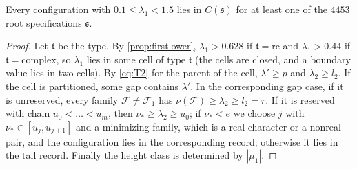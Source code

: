 \begin{theorem}\label{thm:sourcecover}
Every configuration with $0.1\le\lambda_1<1.5$ lies in $C(\mathfrak s)$ for at least one of the $4453$
root specifications $\mathfrak s$.
\end{theorem}

\begin{proof}
Let $\mathfrak t$ be the type. By \cref{prop:firstlower}, $\lambda_1>0.628$ if $\mathfrak t=\mathrm{rc}$ and
$\lambda_1>0.44$ if $\mathfrak t=\mathrm{complex}$, so $\lambda_1$ lies in some cell of type $\mathfrak t$ (the
cells are closed, and a boundary value lies in two cells). By \eqref{eq:T2} for the parent of the
cell, $\lambda'\ge p$ and $\lambda_2\ge l_2$. If the cell is partitioned, some gap contains $\lambda'$.
In the corresponding gap case, if it is unreserved, every family $\mathcal F\ne\mathcal F_1$ has $\nu(\mathcal F)\ge\lambda_2\ge
l_2=r$. If it is reserved with chain $u_0<\dots<u_m$, then $\nu_*\ge\lambda_2\ge u_0$; if $\nu_*<e$
we choose $j$ with $\nu_*\in[u_j,u_{j+1}]$ and a minimizing family, which is a real character or a
nonreal pair, and the configuration lies in the corresponding record; otherwise it lies in the
tail record. Finally the height class is determined by $|\mu_1|$.
\end{proof}

